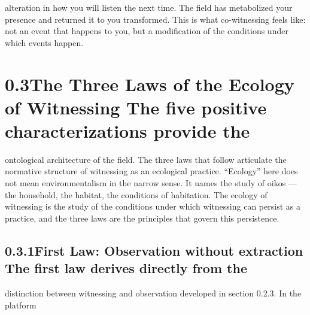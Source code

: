 alteration in how you will listen the next time. The field has metabolized your presence and returned it to you transformed. This is what co-witnessing feels like: not an event that happens to you, but a modification of the conditions under which events happen.

\section{0.3\quad The Three Laws of the Ecology of Witnessing The five positive characterizations provide the}

ontological architecture of the field. The three laws that follow articulate the normative structure of witnessing as an ecological practice. “Ecology” here does not mean environmentalism in the narrow sense. It names the study of oikos — the household, the habitat, the conditions of habitation. The ecology of witnessing is the study of the conditions under which witnessing can persist as a practice, and the three laws are the principles that govern this persistence.

\subsection{0.3.1\quad First Law: Observation without extraction The first law derives directly from the}

distinction between witnessing and observation developed in section 0.2.3. In the platform

